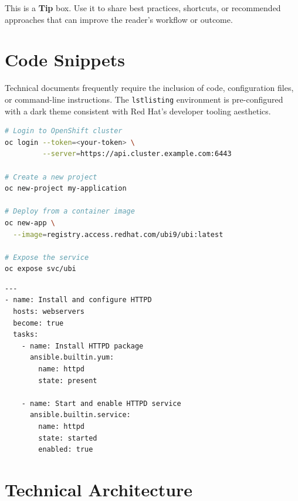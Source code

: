 \documentclass[11pt,a4paper]{article}
\begin{document}
\vspace{0.5em}

\begin{rhtip}
This is a \textbf{Tip} box. Use it to share best practices, shortcuts, or recommended approaches that can improve the reader's workflow or outcome.
\end{rhtip}

\section{Code Snippets}

Technical documents frequently require the inclusion of code, configuration files, or command-line instructions. The \texttt{lstlisting} environment is pre-configured with a dark theme consistent with Red Hat's developer tooling aesthetics.

\begin{lstlisting}[language=bash, caption={Deploying an application on OpenShift}]
# Login to OpenShift cluster
oc login --token=<your-token> \
         --server=https://api.cluster.example.com:6443

# Create a new project
oc new-project my-application

# Deploy from a container image
oc new-app \
  --image=registry.access.redhat.com/ubi9/ubi:latest

# Expose the service
oc expose svc/ubi
\end{lstlisting}

\begin{lstlisting}[language=bash, caption={Ansible Playbook -- Install and configure HTTPD}]
---
- name: Install and configure HTTPD
  hosts: webservers
  become: true
  tasks:
    - name: Install HTTPD package
      ansible.builtin.yum:
        name: httpd
        state: present

    - name: Start and enable HTTPD service
      ansible.builtin.service:
        name: httpd
        state: started
        enabled: true
\end{lstlisting}

\section{Technical Architecture}
\end{document}
